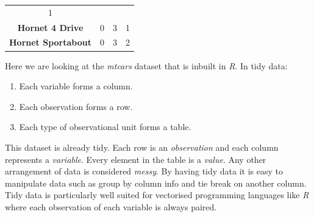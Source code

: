 \documentclass[12pt,oneside]{reedthesis}
\providecommand{\tightlist}{%
  \setlength{\itemsep}{0pt}\setlength{\parskip}{0pt}}
\theoremstyle{definition}
\theoremstyle{definition}
\theoremstyle{definition}
\theoremstyle{remark}
\begin{document}
\begin{longtable}[]{@{}cccc@{}}
\begin{minipage}[t]{0.09\columnwidth}
1\strut
\end{minipage}\tabularnewline
\begin{minipage}[t]{0.30\columnwidth}\centering\strut
\textbf{Hornet 4 Drive}\strut
\end{minipage} & \begin{minipage}[t]{0.06\columnwidth}\centering\strut
0\strut
\end{minipage} & \begin{minipage}[t]{0.09\columnwidth}\centering\strut
3\strut
\end{minipage} & \begin{minipage}[t]{0.09\columnwidth}\centering\strut
1\strut
\end{minipage}\tabularnewline
\begin{minipage}[t]{0.30\columnwidth}\centering\strut
\textbf{Hornet Sportabout}\strut
\end{minipage} & \begin{minipage}[t]{0.06\columnwidth}\centering\strut
0\strut
\end{minipage} & \begin{minipage}[t]{0.09\columnwidth}\centering\strut
3\strut
\end{minipage} & \begin{minipage}[t]{0.09\columnwidth}\centering\strut
2\strut
\end{minipage}\tabularnewline
\bottomrule
\end{longtable}
Here we are looking at the \emph{mtcars} dataset that is inbuilt in
\emph{R}. In tidy data:
\begin{enumerate}
\def\labelenumi{\arabic{enumi}.}
\tightlist
\item
  Each variable forms a column.
\item
  Each observation forms a row.
\item
  Each type of observational unit forms a table.
\end{enumerate}
This dataset is already tidy. Each row is an \emph{observation} and each
column represents a \emph{variable}. Every element in the table is a
\emph{value}. Any other arrangement of data is considered \emph{messy}.
By having tidy data it is easy to manipulate data such as group by
column info and tie break on another column. Tidy data is particularly
well suited for vectorised programming languages like \emph{R} where
each observation of each variable is always paired.
\end{document}
